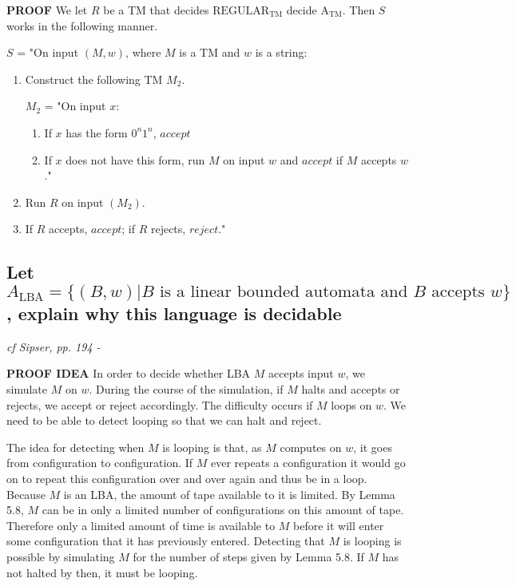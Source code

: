 \documentclass[main.tex]{subfiles}
\begin{document}
\par\textbf{PROOF}
We let $R$ be a TM that decides $\text{REGULAR}_\text{TM}$ decide $\text{A}_\text{TM}$. Then $S$ works in the following manner.

$S$ = "On input $(M, w)$, where $M$ is a TM and $w$ is a string:
\begin{enumerate}
    \item Construct the following TM $M_2$.
    \par $M_2$ = "On input $x$:
        \begin{enumerate}
            \item If $x$ has the form $0^n1^n$, $accept$
            \item If $x$ does not have this form, run $M$ on input $w$ and
$accept$ if $M$ accepts $w$."
        \end{enumerate}{}
    \item Run $R$ on input $(M_2)$.
    \item If $R$ accepts, $accept$; if $R$ rejects, $reject$."
\end{enumerate}{}




\subsection{Let $A_\text{LBA} = \{(B, w) | B \text{ is a linear bounded automata and } B \text{ accepts } w \}$, explain why this language is decidable}

\emph{cf Sipser, pp. 194 - }

\par\textbf{PROOF IDEA}
In order to decide whether LBA $M$ accepts input $w$, we simulate
$M$ on $w$. During the course of the simulation, if $M$ halts and accepts or rejects,
we accept or reject accordingly. The difficulty occurs if $M$ loops on $w$. We need
to be able to detect looping so that we can halt and reject.
\par The idea for detecting when $M$ is looping is that, as $M$ computes on $w$, it
goes from configuration to configuration. If $M$ ever repeats a configuration it
would go on to repeat this configuration over and over again and thus be in
a loop. Because $M$ is an LBA, the amount of tape available to it is limited. By
Lemma 5.8, $M$ can be in only a limited number of configurations on this amount
of tape. Therefore only a limited amount of time is available to $M$ before it
will enter some configuration that it has previously entered. Detecting that $M$ is
looping is possible by simulating $M$ for the number of steps given by Lemma 5.8.
If $M$ has not halted by then, it must be looping.
\end{document}
